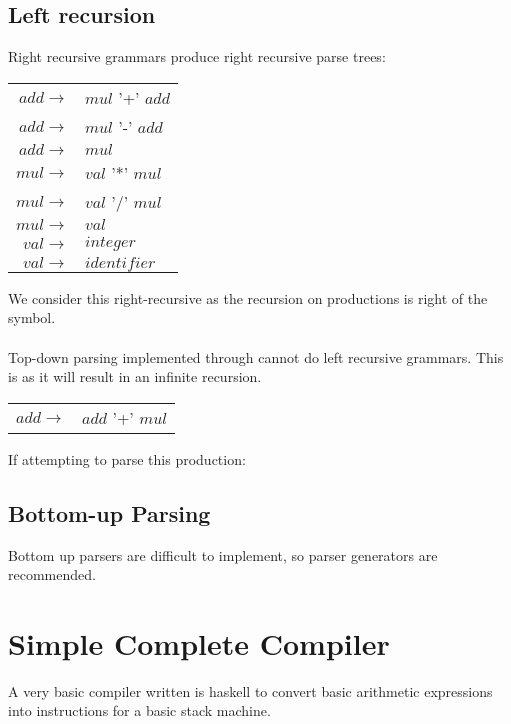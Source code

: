 \documentclass{report}
\begin{document}
\subsection*{Left recursion}
Right recursive grammars produce right recursive parse trees:
\begin{center}
	\begin{tabular}{r l }
		$add \to$ & $mul$ '+' $add$ \\
		$add \to$ & $mul$ '-' $add$ \\
		$add \to$ & $mul$           \\
		$mul \to$ & $val$ '*' $mul$ \\
		$mul \to$ & $val$ '/' $mul$ \\
		$mul \to$ & $val$           \\
		$val \to$ & $integer$       \\
		$val \to$ & $identifier$    \\
	\end{tabular}
\end{center}
We consider this right-recursive as the recursion on productions is right of the symbol.
\\
\\ Top-down parsing implemented through  cannot do left recursive grammars. This is as it will result in an infinite recursion.
\begin{center}
	\begin{tabular}{r l }
		$add \to$ & $add$ '+' $mul$ \\
	\end{tabular}
\end{center}
If attempting to parse this production:

\subsection*{Bottom-up Parsing}
Bottom up parsers are difficult to implement, so parser generators are recommended.

\section*{Simple Complete Compiler}
A very basic compiler written is haskell to convert basic arithmetic expressions into instructions for a basic stack machine.
\end{document}
